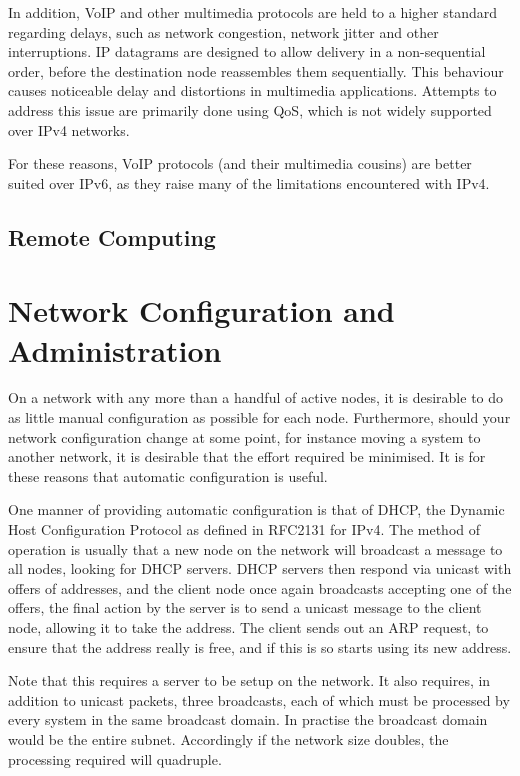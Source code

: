 \documentclass[a4paper,12pt]{article}
\begin{document}
In addition, VoIP and other multimedia protocols are held to a higher
standard regarding delays, such as network congestion, network jitter 
and other interruptions. IP datagrams are designed to allow delivery 
in a non-sequential order, before the destination node reassembles them
sequentially. This behaviour causes noticeable delay and distortions in 
multimedia applications. Attempts to address this issue are primarily
done using QoS, which is not widely supported over IPv4 networks.


For these reasons, VoIP protocols (and their multimedia cousins) are
better suited over IPv6, as they raise many of the limitations
encountered with IPv4. 

\subsection{Remote Computing}


\section{Network Configuration and Administration}

On a network with any more than a handful of active nodes, it is desirable to
do as little manual configuration as possible for each node. Furthermore,
should your network configuration change at some point, for instance moving a
system to another network, it is desirable that the effort required be
minimised. It is for these reasons that automatic configuration is useful.

One manner of providing automatic configuration is that of DHCP, the Dynamic
Host Configuration Protocol as defined in RFC2131 for IPv4. The method of
operation is usually that a new node on the network will broadcast a message to
all nodes, looking for DHCP servers. DHCP servers then respond via unicast with
offers of addresses, and the client node once again broadcasts accepting one of
the offers, the final action by the server is to send a unicast message to the
client node, allowing it to take the address. The client sends out an ARP
request, to ensure that the address really is free, and if this is so starts
using its new address.

Note that this requires a server to be setup on the network. It also requires,
in addition to unicast packets, three broadcasts, each of which must be
processed by every system in the same broadcast domain. In practise the
broadcast domain would be the entire subnet. Accordingly if the network size
doubles, the processing required will quadruple.
\end{document}

